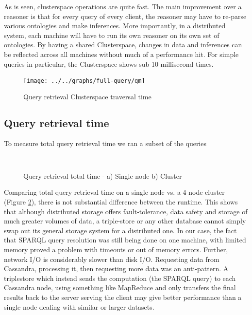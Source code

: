 \documentclass[conference]{IEEEtran}
\begin{document}
As is seen, clusterspace operations are quite fast. The main improvement over a reasoner is that for every query of every client, the reasoner may have to re-parse various ontologies and make inferences. More importantly, in a distributed system, each machine will have to run its own reasoner on its own set of ontologies. By having a shared Clusterspace, changes in data and inferences can be reflected across all machines without much of a performance hit. For simple queries in particular, the Clusterspace shows sub 10 millisecond times.

\begin{figure}[h]
    \centering
    \texttt{[image: ../../graphs/full-query/qm]}
    \caption{Query retrieval Clusterspace traversal time}
    \label{fig:eval:qcs}
\end{figure}

\subsection{Query retrieval time}

To measure total query retrieval time we ran a subset of the queries

\begin{figure}[t]
    \centering
    \mbox{
        \quad
    }
    \caption{Query retrieval total time - a) Single node b) Cluster }
    \label{fig:eval:qtotal}
\end{figure}

Comparing total query retrieval time on a single node vs. a 4 node cluster
(Figure \ref{fig:eval:qtotal}), there is not substantial difference between the
runtime. This shows that although distributed storage offers fault-tolerance,
data safety and storage of much greater volumes of data, a triple-store or any
other database cannot simply swap out its general storage system for
a distributed one. In our case, the fact that SPARQL query resolution was still
being done on one machine, with limited memory proved a problem with timeouts
or out of memory errors. Further, network I/O is considerably slower than disk
I/O. Requesting data from Cassandra, processing it, then requesting more data
was an anti-pattern. A triplestore which instead sends the computation (the
SPARQL query) to each Cassandra node, using something like
MapReduce\cite{Dean04mapreduce:simplified} and only transfers the final results
back to the server serving the client may give better performance than a single
node dealing with similar or larger
datasets\cite{myung10spa}\cite{hus09hadoop}.
\end{document}
